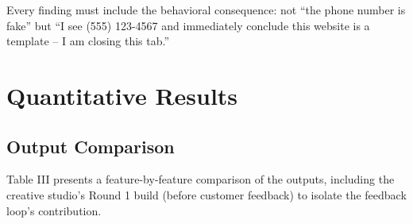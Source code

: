 \documentclass[conference]{IEEEtran}
\begin{document}
Every finding must include the behavioral consequence: not ``the phone number is fake'' but ``I see (555) 123-4567 and immediately conclude this website is a template -- I am closing this tab.''

\section{Quantitative Results}\label{quantitative-results}

\subsection{Output Comparison}\label{output-comparison}

Table III presents a feature-by-feature comparison of the outputs, including the creative studio's Round 1 build (before customer feedback) to isolate the feedback loop's contribution.
\end{document}
